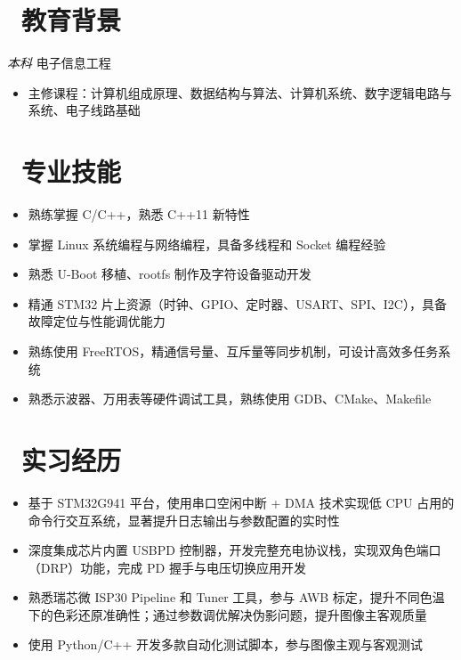 \documentclass{resume}
\begin{document}



\section{\faGraduationCap\ 教育背景}
\textit{本科} \quad 电子信息工程
\begin{itemize}[parsep=0.5ex]
  \item 主修课程：计算机组成原理、数据结构与算法、计算机系统、数字逻辑电路与系统、电子线路基础
\end{itemize}

\section{\faCogs\ 专业技能}
\begin{itemize}[parsep=0.5ex]
  \item 熟练掌握 C/C++，熟悉 C++11 新特性
  \item 掌握 Linux 系统编程与网络编程，具备多线程和 Socket 编程经验
  \item 熟悉 U-Boot 移植、rootfs 制作及字符设备驱动开发
  \item 精通 STM32 片上资源（时钟、GPIO、定时器、USART、SPI、I2C），具备故障定位与性能调优能力
  \item 熟练使用 FreeRTOS，精通信号量、互斥量等同步机制，可设计高效多任务系统
  \item 熟悉示波器、万用表等硬件调试工具，熟练使用 GDB、CMake、Makefile
\end{itemize}

\section{\faUsers\ 实习经历}
\begin{itemize}
  \item 基于 STM32G941 平台，使用串口空闲中断 + DMA 技术实现低 CPU 占用的命令行交互系统，显著提升日志输出与参数配置的实时性
  \item 深度集成芯片内置 USBPD 控制器，开发完整充电协议栈，实现双角色端口（DRP）功能，完成 PD 握手与电压切换应用开发
  \item 熟悉瑞芯微 ISP30 Pipeline 和 Tuner 工具，参与 AWB 标定，提升不同色温下的色彩还原准确性；通过参数调优解决伪影问题，提升图像主客观质量
  \item 使用 Python/C++ 开发多款自动化测试脚本，参与图像主观与客观测试
\end{itemize}
\end{document}
